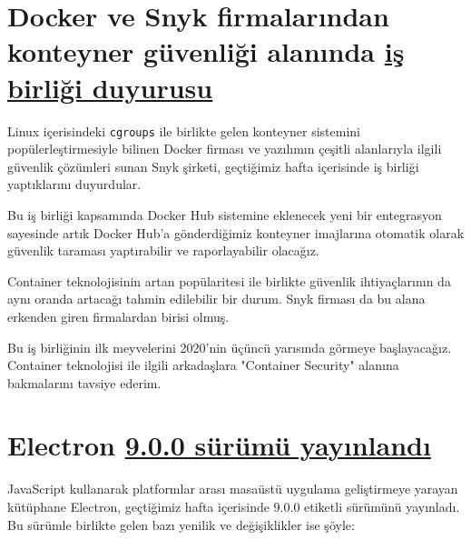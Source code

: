 \documentclass[11pt]{article}
\begin{document}
\section{Docker ve Snyk firmalarından konteyner güvenliği alanında \href{https://www.docker.com/press-release/Docker-Snyk-Announce-Partnership-Container-Vulnerability-Scanning}{iş birliği duyurusu}}
\label{sec:orgf626897}
Linux içerisindeki \texttt{cgroups} ile birlikte gelen konteyner sistemini
popülerleştirmesiyle bilinen Docker firması ve yazılımın çeşitli alanlarıyla
ilgili güvenlik çözümleri sunan Snyk şirketi, geçtiğimiz hafta içerisinde iş
birliği yaptıklarını duyurdular.

Bu iş birliği kapsamında Docker Hub sistemine eklenecek yeni bir entegrasyon
sayesinde artık Docker Hub'a gönderdiğimiz konteyner imajlarına otomatik
olarak güvenlik taraması yaptırabilir ve raporlayabilir olacağız.

Container teknolojisinin artan popülaritesi ile birlikte güvenlik
ihtiyaçlarının da aynı oranda artacağı tahmin edilebilir bir durum. Snyk
firması da bu alana erkenden giren firmalardan birisi olmuş.

Bu iş birliğinin ilk meyvelerini 2020'nin üçüncü yarısında görmeye
başlayacağız. Container teknolojisi ile ilgili arkadaşlara "Container
Security" alanına bakmalarını tavsiye ederim.
\section{Electron \href{https://www.electronjs.org/blog/electron-9-0}{9.0.0 sürümü yayınlandı}}
\label{sec:org512e157}
JavaScript kullanarak platformlar arası masaüstü uygulama geliştirmeye yarayan
kütüphane Electron, geçtiğimiz hafta içerisinde 9.0.0 etiketli sürümünü
yayınladı. Bu sürümle birlikte gelen bazı yenilik ve değişiklikler ise şöyle:
\end{document}
